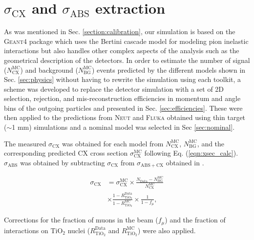 \section{$\sigma_{\mathrm{CX}}$ and $\sigma_{\mathrm{ABS}}$ extraction}\label{sec:xsec}
As was mentioned in Sec. \ref{section:calibration}, our simulation is based on the \textsc{Geant4} package which uses the Bertini cascade model for modeling pion inelastic interactions but also handles other complex aspects of the analysis such as the geometrical description of the detectors. In order to estimate the number of signal ($N_{\mathrm{CX}}^{\mathrm{MC}}$) and background ($N_{\mathrm{BG}}^{\mathrm{MC}}$) events predicted by the different models shown in Sec. \ref{sec:physics} without having to rewrite the simulation using each toolkit, a scheme was developed to replace the detector simulation with a set of 2D selection, rejection, and mis-reconstruction efficiencies in {\color{red} momentum and angle} bins of the outgoing particles and presented in Sec. \ref{sec:efficiencies}. These were then applied to the predictions from \textsc{Neut} and \textsc{Fluka} obtained using thin target {\color{red}($\sim$1 mm)} simulations and a nominal model was selected in Sec \ref{sec:nominal}.

The measured $\sigma_{\mathrm{CX}}$ was obtained for each model from $N_{\mathrm{CX}}^{\mathrm{MC}}$, $N_{\mathrm{BG}}^{\mathrm{MC}}$, and the corresponding predicted CX cross section $\sigma_{\mathrm{CX}}^{\mathrm{MC}}$ following Eq. (\ref{eqn:xsec_calc}). $\sigma_{\mathrm{ABS}}$ was obtained by subtracting $\sigma_{\mathrm{CX}}$ from $\sigma_{\mathrm{ABS+CX}}$ obtained in \cite{duet}.

 \begin{equation} \label{eqn:xsec_calc}
 \begin{aligned}
 \sigma_{\mathrm{CX}} &= 
 \sigma_{\mathrm{CX}}^{\mathrm{MC}}
 \times \frac{N_{\mathrm{Data}}-N_{\mathrm{BG}}^{\mathrm{MC}}}{N_{\mathrm{CX}}^{\mathrm{MC}}} \\
 &\times
 \frac{1-R_{\mathrm{TiO}_2}^{\mathrm{Data}}}{1-R_{\mathrm{TiO}_2}^{\mathrm{MC}}}
 \times \frac{1}{1-f_{\mu}},
 \end{aligned}
 \end{equation} 

Corrections for the fraction of muons in the beam ($f_{\mu}$) and the fraction of interactions on TiO$_2$ nuclei ($R_{\mathrm{TiO}_2}^{\mathrm{Data}}$ and $R_{\mathrm{TiO}_2}^{\mathrm{MC}}$) were also applied. 

